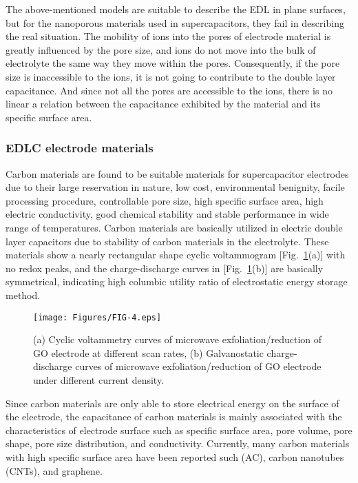 \documentclass[reprint,amsmath,amssymb,aps,floatfix,
]{revtex4-2}
\begin{document}
The above-mentioned models are suitable to describe the EDL in plane surfaces, but for the nanoporous materials used in supercapacitors, they fail in describing the real situation. The mobility of ions into the pores of electrode material is greatly influenced by the pore size, and ions do not move into the bulk of electrolyte the same way they move within the pores. Consequently, if the pore size is inaccessible to the ions, it is not going to contribute to the double layer capacitance.\cite{Sharma2010} And since not all the pores are accessible to the ions, there is no linear a relation between the capacitance exhibited by the material and its specific surface area.\cite{BARBIERI2005}\cite{qu1998}\cite{Gamby2001}\cite{SHI1996}
\subsubsection{EDLC electrode materials}
Carbon materials are found to be suitable materials for supercapacitor electrodes due to their large reservation in nature, low cost, environmental benignity, facile processing procedure, controllable pore size, high specific surface area, high electric conductivity, good chemical stability and stable performance in wide range of temperatures. Carbon materials are basically utilized in electric double layer capacitors due to stability of carbon materials in the electrolyte. These materials show a nearly rectangular shape cyclic voltammogram [Fig.~\ref{fig:fig4}(a)] with no redox peaks, and the charge-discharge curves in [Fig.~\ref{fig:fig4}(b)] are basically symmetrical, indicating high columbic utility ratio of electrostatic energy storage method.
\begin{figure}[t]
    \centering
    \texttt{[image: Figures/FIG-4.eps]}
    \caption{\label{fig:fig4} (a) Cyclic voltammetry curves of microwave exfoliation/reduction of GO electrode at different scan rates, (b) Galvanostatic charge-discharge curves of microwave exfoliation/reduction of GO electrode under different current density.\cite{Zhu2011}}
    \end{figure}
Since carbon materials are only able to store electrical energy on the surface of the electrode, the capacitance of carbon materials is mainly associated with the characteristics of electrode surface such as specific surface area, pore volume, pore shape, pore size distribution, and conductivity. Currently, many carbon materials with high specific surface area have been reported such (AC),\cite{Zhuangjun2011,Hulicova2009,Mastragostino1996,Ruiz2009,Hongtao2006} carbon nanotubes (CNTs),\cite{An2001,Zhuangjun2010,Futaba2006} and graphene.\cite{Chenguang2010,Zhao2013,Zhenhai2012}
\end{document}
